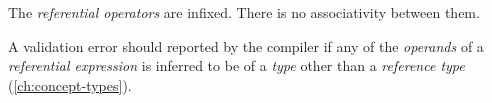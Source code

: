 The \emph{referential operators} are infixed.
There is no associativity between them.

A validation error should reported by the compiler if any of the \emph{operands}
of a \emph{referential expression} is inferred to be of a \emph{type}
other than a \emph{reference type} (\ref{ch:concept-types}).
